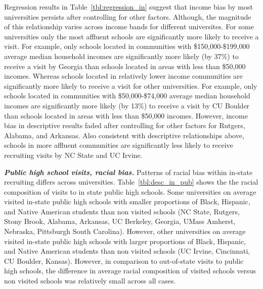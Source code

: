 \documentclass[twoside]{article}
\begin{document}
Regression results in Table~\ref{tbl:regression_in} suggest that income bias by most universities persists after controlling for other factors. Although, the magnitude of this relationship varies across income bands for different universites. For some universities only the most affluent schools are significantly more likely to receive a visit. For example, only schools located in communities with \$150,000-\$199,000 average median household incomes are significantly more likely (by 37\%) to receive a visit by Georgia than schools located in areas with less than \$50,000 incomes. Whereas schools located in relatively lower income communities are significantly more likely to receive a visit for other universities. For example, only schools located in communities with \$50,000-\$74,000 average median household incomes are significantly more likely (by 13\%) to receive a visit by CU Boulder than schools located in areas with less than \$50,000 incomes. However, income bias in descriptive results faded after controlling for other factors for Rutgers, Alabama, and Arkansas. Also consistent with descriptive relationships above, schools in more affluent communities are significantly less likely to receive recruiting visits by NC State and UC Irvine.


\textbf{\textit{Public high school visits, racial bias.}} Patterns of racial bias within in-state recruiting differs across universities. Table~\ref{tbl:desc_in_pub} shows the the racial composition of visits to in state public high schools. Some universities on average visited in-state public high schools with smaller proportions of Black, Hispanic, and Native American students than non visited schools (NC State, Rutgers, Stony Brook, Alabama, Arkansas, UC Berkeley, Georgia, UMass Amherst, Nebraska, Pittsburgh South Carolina). However, other universities on average visited in-state public high schools with larger proportions of Black,  Hispanic, and Native American students than non visited schools (UC Irvine, Cincinnati, CU Boulder, Kansas). However, in comparison to out-of-state visits to public high schools, the difference in average racial composition of visited schools versus non visited schools was relatively small across all cases.
\end{document}
